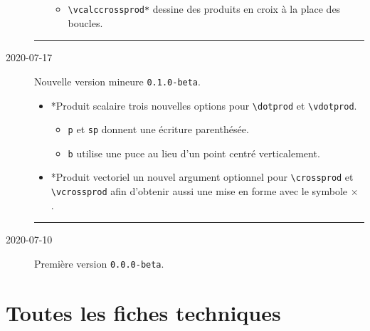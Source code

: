 \documentclass[12pt,a4paper]{article}
\makeatletter
\theoremstyle{definition}
\newcommand\topic{\@ifstar{\@topic@star}{\@topic@no@star}}
\newcommand\@topic@no@star[1]{%
    \textbf{\textsc{#1}.}%
}
\newcommand\@topic@star[1]{%
    \textbf{\textsc{#1} :}%
}
\newcommand\env[1]{\texttt{#1}}
\newcommand\macro[1]{\env{\textbackslash{}#1}}
\newcommand\separation{
    \medskip
    \hfill\rule{0.5\textwidth}{0.75pt}\hfill
    \medskip
}
\makeatother
\begin{document}
\begin{description}
\begin{itemize}[itemsep=.5em]
\begin{itemize}[itemsep=.5em]
            \item \macro{vcalccrossprod*} dessine des produits en croix à la place des boucles.
        \end{itemize}
    
    
    \end{itemize}
    
    \separation


    \medskip
    \item[2020-07-17] Nouvelle version mineure \verb+0.1.0-beta+.
    
    \begin{itemize}[itemsep=.5em]
        \item \topic*{Produit scalaire}
              trois nouvelles options pour \macro{dotprod} et \macro{vdotprod}.
        \begin{itemize}[itemsep=.5em]
            \item \verb+p+ et \verb+sp+ donnent une écriture parenthésée.
    
            \item \verb+b+ utilise une puce au lieu d'un point centré verticalement.
        \end{itemize}
    
    
        \item \topic*{Produit vectoriel}
              un nouvel argument optionnel pour \macro{crossprod} et \macro{vcrossprod} afin d'obtenir aussi une mise en forme avec le symbole $\times$ .
    \end{itemize}
    
    \separation


    \medskip
    \item[2020-07-10] Première version \verb+0.0.0-beta+.

\end{description}


\newpage
\section{Toutes les fiches techniques} \label{techincal-ids}
\end{document}
